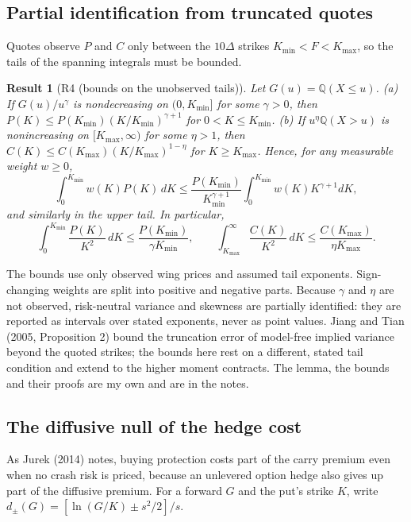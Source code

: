 \documentclass[11pt]{article}
\theoremstyle{result}
\newtheorem*{result}{Result}
\newcommand{\Q}{\mathbb{Q}}
\newcommand{\D}{\Delta}
\begin{document}
\subsection{Partial identification from truncated quotes}

Quotes observe $P$ and $C$ only between the $10\D$ strikes $K_{\min}<F<K_{\max}$, so the tails of the spanning integrals must be bounded.

\begin{result}[R4 (bounds on the unobserved tails)]
Let $G(u)=\Q(X\le u)$. (a) If $G(u)/u^\gamma$ is nondecreasing on $(0,K_{\min}]$ for some $\gamma>0$, then $P(K)\le P(K_{\min})(K/K_{\min})^{\gamma+1}$ for $0<K\le K_{\min}$. (b) If $u^\eta\Q(X>u)$ is nonincreasing on $[K_{\max},\infty)$ for some $\eta>1$, then $C(K)\le C(K_{\max})(K/K_{\max})^{1-\eta}$ for $K\ge K_{\max}$. Hence, for any measurable weight $w\ge0$,
\[
\int_0^{K_{\min}}w(K)P(K)\,dK\le\frac{P(K_{\min})}{K_{\min}^{\gamma+1}}\int_0^{K_{\min}}w(K)K^{\gamma+1}dK,
\]
and similarly in the upper tail. In particular,
\[
\int_0^{K_{\min}}\frac{P(K)}{K^2}\,dK\le\frac{P(K_{\min})}{\gamma K_{\min}},\qquad \int_{K_{\max}}^\infty\frac{C(K)}{K^2}\,dK\le\frac{C(K_{\max})}{\eta K_{\max}}.
\]
\end{result}

The bounds use only observed wing prices and assumed tail exponents. Sign-changing weights are split into positive and negative parts. Because $\gamma$ and $\eta$ are not observed, risk-neutral variance and skewness are partially identified: they are reported as intervals over stated exponents, never as point values. Jiang and Tian (2005, Proposition 2) bound the truncation error of model-free implied variance beyond the quoted strikes; the bounds here rest on a different, stated tail condition and extend to the higher moment contracts. The lemma, the bounds and their proofs are my own and are in the notes.

\subsection{The diffusive null of the hedge cost}\label{sec:r6}

As Jurek (2014) notes, buying protection costs part of the carry premium even when no crash risk is priced, because an unlevered option hedge also gives up part of the diffusive premium. For a forward $G$ and the put's strike $K$, write $d_\pm(G)=[\ln(G/K)\pm s^2/2]/s$.
\end{document}
